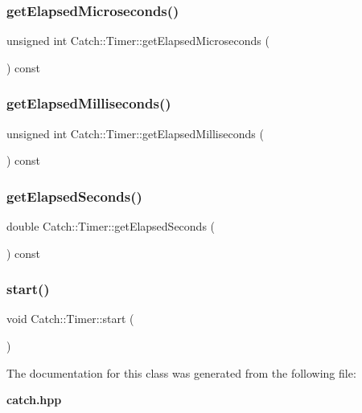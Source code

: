 \subsubsection{get\+Elapsed\+Microseconds()}
{\footnotesize\ttfamily unsigned int Catch\+::\+Timer\+::get\+Elapsed\+Microseconds (\begin{DoxyParamCaption}{ }\end{DoxyParamCaption}) const}

\mbox{\label{class_catch_1_1_timer_a2081b2d36950ab6912e7c4958afe0099}} 
\subsubsection{get\+Elapsed\+Milliseconds()}
{\footnotesize\ttfamily unsigned int Catch\+::\+Timer\+::get\+Elapsed\+Milliseconds (\begin{DoxyParamCaption}{ }\end{DoxyParamCaption}) const}

\mbox{\label{class_catch_1_1_timer_ae1615c8a9aa44b7a96cfe8a35d34e5de}} 
\subsubsection{get\+Elapsed\+Seconds()}
{\footnotesize\ttfamily double Catch\+::\+Timer\+::get\+Elapsed\+Seconds (\begin{DoxyParamCaption}{ }\end{DoxyParamCaption}) const}

\mbox{\label{class_catch_1_1_timer_a0a56e879e43f36c102bf9ea8b5fc8b72}} 
\subsubsection{start()}
{\footnotesize\ttfamily void Catch\+::\+Timer\+::start (\begin{DoxyParamCaption}{ }\end{DoxyParamCaption})}



The documentation for this class was generated from the following file\+:\begin{DoxyCompactItemize}
\item 
\textbf{ catch.\+hpp}\end{DoxyCompactItemize}
